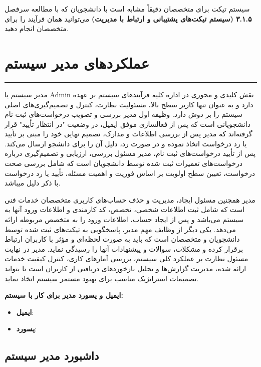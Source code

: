 \documentclass[12pt,a4paper]{report}
\begin{document}
	سیستم تیکت برای متخصصان دقیقاً مشابه است با دانشجویان که با مطالعه سرفصل \textbf{۳.۱.۵ (سیستم تیکت‌های پشتیبانی و ارتباط با مدیریت)} می‌توانید همان فرآیند را برای متخصصان انجام دهید.
	
	\section{عملکردهای مدیر سیستم}
	\noindent\rule{\textwidth}{0.4pt}
	
	مدیر سیستم یا Admin نقش کلیدی و محوری در اداره کلیه فرآیندهای سیستم بر عهده دارد و به عنوان تنها کاربر سطح بالا، مسئولیت نظارت، کنترل و تصمیم‌گیری‌های اصلی سیستم را بر دوش دارد. وظیفه اول مدیر بررسی و تصویب درخواست‌های ثبت نام دانشجویانی است که پس از فعالسازی موفق ایمیل، در وضعیت "در انتظار تأیید" قرار گرفته‌اند که مدیر پس از بررسی اطلاعات و مدارک، تصمیم نهایی خود را مبنی بر تأیید یا رد درخواست اتخاذ نموده و در صورت رد، دلیل آن را برای دانشجو ارسال می‌کند. پس از تأیید درخواست‌های ثبت نام، مدیر مسئول بررسی، ارزیابی و تصمیم‌گیری درباره درخواست‌های تعمیرات ثبت شده توسط دانشجویان است که شامل بررسی صحت درخواست، تعیین سطح اولویت بر اساس فوریت و اهمیت مسئله، تأیید یا رد درخواست با ذکر دلیل میباشد.
	
	مدیر همچنین مسئول ایجاد، مدیریت و حذف حساب‌های کاربری متخصصان خدمات فنی است که شامل ثبت اطلاعات شخصی، تخصص، کد کارمندی و اطلاعات ورود آنها به سیستم می‌باشد و پس از ایجاد حساب، اطلاعات ورود را به متخصص مربوطه ارائه می‌دهد. یکی دیگر از وظایف مهم مدیر، پاسخگویی به تیکت‌های ثبت شده توسط دانشجویان و متخصصان است که باید به صورت لحظه‌ای و مؤثر با کاربران ارتباط برقرار کرده و مشکلات، سوالات و پیشنهادات آنها را رسیدگی نماید. مدیر در نهایت مسئول نظارت بر عملکرد کلی سیستم، بررسی آمارهای کاری، کنترل کیفیت خدمات ارائه شده، مدیریت گزارش‌ها و تحلیل بازخوردهای دریافتی از کاربران است تا بتواند تصمیمات استراتژیک مناسب برای بهبود مستمر سیستم اتخاذ نماید.
	
	\textbf{ایمیل و پسورد مدیر برای کار با سیستم:}
	\begin{itemize}
		\item \textbf{ایمیل}: 
		\item \textbf{پسورد}: 
	\end{itemize}
	
	\subsection{داشبورد مدیر سیستم}
	
\end{document}

